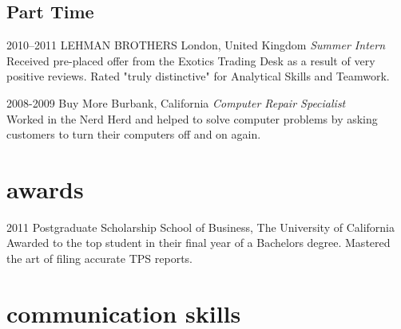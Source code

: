 \documentclass[]{friggeri-cv-a4}
\begin{document}
\subsection{Part Time}

\begin{entrylist}

\entry
{2010--2011}
{LEHMAN BROTHERS}
{London, United Kingdom}
{\emph{Summer Intern} \\
Received pre-placed offer from the Exotics Trading Desk as a result of very positive reviews. Rated "truly distinctive" for Analytical Skills and Teamwork.}


\entry
{2008-2009}
{Buy More}
{Burbank, California}
{\emph{Computer Repair Specialist} \\
Worked in the Nerd Herd and helped to solve computer problems by asking customers to turn their computers off and on again.}


\end{entrylist}


\section{awards}

\begin{entrylist}


\entry
{2011}
{Postgraduate Scholarship}
{School of Business, The University of California}
{Awarded to the top student in their final year of a Bachelors degree. Mastered the art of filing accurate TPS reports.}


\end{entrylist}


\section{communication skills}
\end{document}
